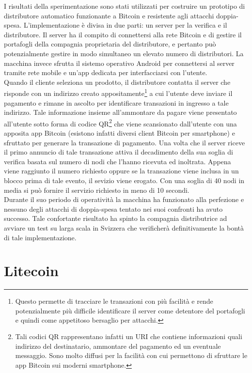 I risultati della sperimentazione sono stati utilizzati per costruire un prototipo di distributore automatico funzionante a Bitcoin e resistente agli attacchi doppia-spesa.
L'implementazione è divisa in due parti: un server per la verifica e il distributore. Il server ha il compito di connettersi alla rete Bitcoin e di gestire il portafogli della compagnia proprietaria del distributore, e pertanto può potenzialmente gestire in modo simultaneo un elevato numero di distributori. La macchina invece sfrutta il sistemo operativo Android per connettersi al server tramite rete mobile e un'app dedicata per interfacciarsi con l'utente.\\
Quando il cliente seleziona un prodotto, il distributore contatta il server che risponde con un indirizzo creato appositamente\footnote{Questo permette di tracciare le transazioni con più facilità e rende potenzialmente più difficile identificare il server come detentore del portafogli e quindi come appetitoso bersaglio per attacchi.} a cui l'utente deve inviare il pagamento e rimane in ascolto per identificare transazioni in ingresso a tale indirizzo. Tale informazione insieme all'ammontare da pagare viene presentato all'utente sotto forma di codice QR\footnote{Tali codici QR rappresentano infatti un URI che contiene informazioni quali indirizzo del destinatario, ammontare del pagamento ed un eventuale messaggio. Sono molto diffusi per la facilità con cui permettono di sfruttare le app Bitcoin sui moderni smartphone.} che viene scansionato dall'utente con una apposita app Bitcoin (esistono infatti diversi client Bitcoin per smartphone) e sfruttato per generare la transazione di pagamento. Una volta che il server riceve il primo annuncio di tale transazione attiva il decadimento della sua soglia di verifica basata sul numero di nodi che l'hanno ricevuta ed inoltrata. Appena viene raggiunto il numero richiesto oppure se la transazione viene inclusa in un blocco prima di tale evento, il sevizio viene erogato. Con una soglia di 40 nodi in media si può fornire il servizio richiesto in meno di 10 secondi.\\
Durante il suo periodo di operatività la macchina ha funzionato alla perfezione e nessuno degli attacchi di doppia-spesa tentato nei suoi confronti ha avuto successo. Tale confortante risultato ha spinto la compagnia distributrice ad avviare un test su larga scala in Svizzera che verificherà definitivamente la bontà di tale implementazione.

\section{Litecoin}

